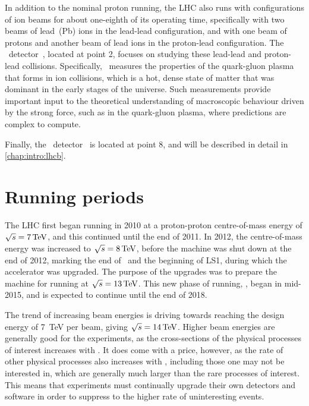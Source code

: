 In addition to the nominal proton running, the \ac{LHC} also runs with 
configurations of ion beams for about one-eighth of its operating time, 
specifically with two beams of lead~(Pb) ions in the lead-lead configuration, 
and with one beam of protons and another beam of lead ions in the proton-lead 
configuration.
The \alice\ detector~\cite{Aamodt:2008zz}, located at point 2, focuses on 
studying these lead-lead and proton-lead collisions.
Specifically, \alice\ measures the properties of the quark-gluon plasma that 
forms in ion collisions, which is a hot, dense state of matter that was 
dominant in the early stages of the universe.
Such measurements provide important input to the theoretical understanding of 
macroscopic behaviour driven by the strong force, such as in the quark-gluon 
plasma, where predictions are complex to compute.

Finally, the \lhcb\ detector~\cite{Alves:2008zz} is located at point 8, and 
will be described in detail in \cref{chap:intro:lhcb}.

\section{Running periods}

The \ac{LHC} first began running in 2010 at a proton-proton centre-of-mass 
energy of $\sqrts = \SI{7}{\TeV}$, and this continued until the end of 2011.
In 2012, the centre-of-mass energy was increased to $\sqrts = \SI{8}{\TeV}$, 
before the machine was shut down at the end of 2012, marking the end of 
\runone\ and the beginning of \ac{LS1}, during which the accelerator was 
upgraded.
The purpose of the upgrades was to prepare the machine for running at $\sqrts = 
\SI{13}{\TeV}$.
This new phase of running, \runtwo, began in mid-2015, and is expected to 
continue until the end of 2018.

The trend of increasing beam energies is driving towards reaching the design 
energy of \SI{7}{\TeV} per beam, giving $\sqrts = \SI{14}{\TeV}$.
Higher beam energies are generally good for the experiments, as the 
cross-sections of the physical processes of interest increases with \sqrts.
It does come with a price, however, as the rate of other physical processes 
also increases with \sqrts, including those one may not be interested in, which 
are generally much larger than the rare processes of interest.
This means that experiments must continually upgrade their own detectors and 
software in order to suppress to the higher rate of uninteresting events.
